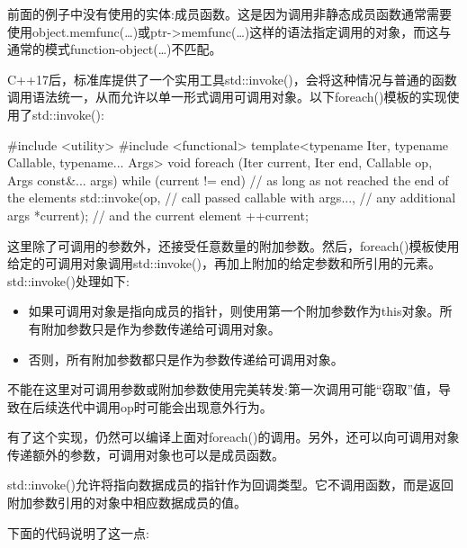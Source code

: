 前面的例子中没有使用的实体:成员函数。这是因为调用非静态成员函数通常需要使用object.memfunc(…)或ptr->memfunc(…)这样的语法指定调用的对象，而这与通常的模式function-object(…)不匹配。

C++17后，标准库提供了一个实用工具std::invoke()，会将这种情况与普通的函数调用语法统一，从而允许以单一形式调用可调用对象。以下foreach()模板的实现使用了std::invoke():

\begin{cpp}
#include <utility>
#include <functional>
template<typename Iter, typename Callable, typename... Args>
void foreach (Iter current, Iter end, Callable op, Args const&... args)
{
	while (current != end) { // as long as not reached the end of the elements
		std::invoke(op, // call passed callable with
					args..., // any additional args
					*current); // and the current element
		++current;
	}
}
\end{cpp}

这里除了可调用的参数外，还接受任意数量的附加参数。然后，foreach()模板使用给定的可调用对象调用std::invoke()，再加上附加的给定参数和所引用的元素。std::invoke()处理如下:

\begin{itemize}
\item
如果可调用对象是指向成员的指针，则使用第一个附加参数作为this对象。所有附加参数只是作为参数传递给可调用对象。

\item
否则，所有附加参数都只是作为参数传递给可调用对象。
\end{itemize}

不能在这里对可调用参数或附加参数使用完美转发:第一次调用可能“窃取”值，导致在后续迭代中调用op时可能会出现意外行为。

有了这个实现，仍然可以编译上面对foreach()的调用。另外，还可以向可调用对象传递额外的参数，可调用对象也可以是成员函数。

\begin{notice}
std::invoke()允许将指向数据成员的指针作为回调类型。它不调用函数，而是返回附加参数引用的对象中相应数据成员的值。
\end{notice}

下面的代码说明了这一点:

